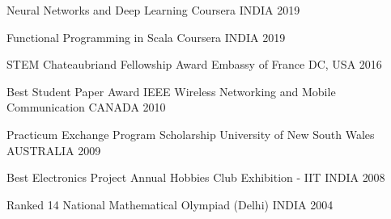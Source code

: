 


\begin{cvhonors}

  \cvhonor
    {Neural Networks and Deep Learning} %
    {Coursera} %
    {INDIA} %
    {2019} %
    
  \cvhonor
    {Functional Programming in Scala} %
    {Coursera} %
    {INDIA} %
    {2019} %
    

  \cvhonor
    {STEM Chateaubriand Fellowship Award} %
    {Embassy of France} %
    {DC, USA} %
    {2016} %

%
  \cvhonor
    {Best Student Paper Award} %
    {IEEE Wireless Networking and Mobile Communication} %
    {CANADA} %
    {2010} %

  \cvhonor
    {Practicum Exchange Program Scholarship} %
    {University of New South Wales} %
    {AUSTRALIA} %
    {2009} %

  \cvhonor
    {Best Electronics Project} %
    {Annual Hobbies Club Exhibition - IIT} %
    {INDIA} %
    {2008} %
    
  \cvhonor
    {Ranked 14} %
    {National Mathematical Olympiad (Delhi)} %
    {INDIA} %
    {2004} %

\end{cvhonors}


